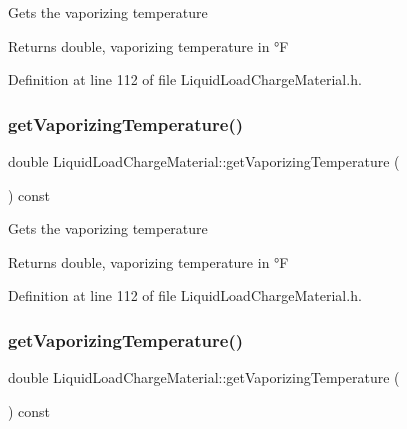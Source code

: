 Gets the vaporizing temperature \begin{DoxyReturn}{Returns}
double, vaporizing temperature in °F 
\end{DoxyReturn}


Definition at line 112 of file Liquid\+Load\+Charge\+Material.\+h.

\mbox{\label{class_liquid_load_charge_material_a07004e345fb4ff287d435d0c84027973}} 
\subsubsection{\texorpdfstring{get\+Vaporizing\+Temperature()}{getVaporizingTemperature()}\hspace{0.1cm}{\footnotesize\ttfamily [2/3]}}
{\footnotesize\ttfamily double Liquid\+Load\+Charge\+Material\+::get\+Vaporizing\+Temperature (\begin{DoxyParamCaption}{ }\end{DoxyParamCaption}) const\hspace{0.3cm}{\ttfamily [inline]}}

Gets the vaporizing temperature \begin{DoxyReturn}{Returns}
double, vaporizing temperature in °F 
\end{DoxyReturn}


Definition at line 112 of file Liquid\+Load\+Charge\+Material.\+h.

\mbox{\label{class_liquid_load_charge_material_a07004e345fb4ff287d435d0c84027973}} 
\subsubsection{\texorpdfstring{get\+Vaporizing\+Temperature()}{getVaporizingTemperature()}\hspace{0.1cm}{\footnotesize\ttfamily [3/3]}}
{\footnotesize\ttfamily double Liquid\+Load\+Charge\+Material\+::get\+Vaporizing\+Temperature (\begin{DoxyParamCaption}{ }\end{DoxyParamCaption}) const\hspace{0.3cm}{\ttfamily [inline]}}

